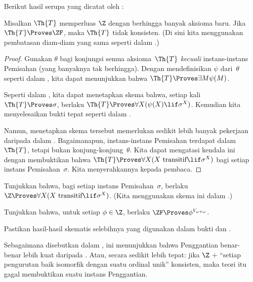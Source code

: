 \documentclass[../../../include/open-logic-section]{subfiles}
\begin{document}
Berikut hasil serupa yang dicatat oleh \citet[223]{Potter2004}:

\begin{prop}
	Misalkan $\Th{T}$ memperluas $\Z$ dengan berhingga banyak aksioma baru.
	Jika $\Th{T}\Proves\ZF$, maka $\Th{T}$ tidak konsisten. (Di sini kita
	menggunakan pembatasan diam-diam yang sama seperti dalam
	.)
\end{prop}
\begin{proof}
	Gunakan $\theta$ bagi konjungsi semua aksioma~$\Th{T}$ \emph{kecuali}
	instans-instans Pemisahan (yang banyaknya tak berhingga). Dengan
	mendefinisikan $\psi$ dari~$\theta$ seperti dalam ,
	kita dapat menunjukkan bahwa $\Th{T}\Proves\exists M\psi(M)$.

	Seperti dalam , kita dapat menetapkan skema bahwa,
	setiap kali $\Th{T}\Proves\sigma$, berlaku
	$\Th{T}\Proves\forall X(\psi(X)\lif\sigma^X)$. Kemudian kita
	menyelesaikan bukti tepat seperti dalam .

	Namun, menetapkan skema tersebut memerlukan sedikit lebih banyak pekerjaan
	daripada dalam . Bagaimanapun, instans-instans
	Pemisahan terdapat dalam~$\Th{T}$, tetapi bukan konjung-konjung~$\theta$.
	Kita dapat mengatasi kendala ini dengan membuktikan bahwa
	$\Th{T}\Proves\forall X(X\text{ transitif}\lif\sigma^X)$ bagi setiap
	instans Pemisahan~$\sigma$. Kita menyerahkannya kepada pembaca.
\end{proof}
\begin{prob}
	Tunjukkan bahwa, bagi setiap instans Pemisahan~$\sigma$, berlaku
	$\Z\Proves\forall X(X\text{ transitif}\lif\sigma^X)$. (Kita menggunakan
	skema ini dalam
	.)
\end{prob}
\begin{prob}
	Tunjukkan bahwa, untuk setiap $\phi\in\Z$, berlaku
	$\ZF\Proves\phi^{V_{\omega+\omega}}$.
\end{prob}
\begin{prob}
	Pastikan hasil-hasil skematis selebihnya yang digunakan dalam bukti
	 dan
	.
\end{prob}

Sebagaimana disebutkan dalam , ini
menunjukkan bahwa Penggantian benar-benar lebih kuat daripada
. Atau, secara sedikit
lebih tepat: jika $\Z$ + ``setiap pengurutan baik isomorfik dengan suatu
ordinal unik'' konsisten, maka teori itu gagal membuktikan suatu instans
Penggantian.


\end{document}
